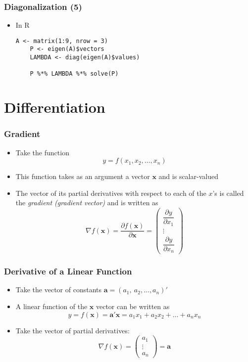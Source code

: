 \documentclass[10pt]{beamer}
\theoremstyle{definition}
\begin{document}
\begin{frame}[fragile]
\frametitle{Diagonalization (5)}
\begin{itemize}
	\item In R
	\begin{lstlisting}[style = rstyle, breaklines]
	A <- matrix(1:9, nrow = 3)
	P <- eigen(A)$vectors
	LAMBDA <- diag(eigen(A)$values)

	P %*% LAMBDA %*% solve(P)	
	\end{lstlisting}
\end{itemize}
\end{frame}

\section{Differentiation}
\begin{frame}[fragile]
	\frametitle{Gradient}
	\begin{itemize}
		\item Take the function
		\[
			y = f(x_{1}, x_{2}, \ldots, x_{n})
		\]
		
		\item This function takes as an argument a vector $ \mathbf{x} $ and is scalar-valued
		
		\item The vector of its partial derivatives with respect to each of the $ x $'s is called the \textit{gradient (gradient vector)} and is written as
		\[
			\nabla f(\mathbf{x}) = \dfrac{\partial f(\mathbf{x})}{\partial \mathbf{x}} = 
			\left(
			\begin{array}{c}
				\dfrac{\partial y}{\partial x_{1}}\\
				\vdots\\
				\dfrac{\partial y}{\partial x_{n}}
			\end{array}
			\right)
		\]
	\end{itemize}
\end{frame}

\begin{frame}[fragile]
	\frametitle{Derivative of a Linear Function}
	\begin{itemize}
		\item Take the vector of constants $ \mathbf{a} = (a_{1},\ a_{2}, \ldots, a_{n})' $
		
		\item A linear function of the $ \mathbf{x} $ vector can be written as
		\[
			y = f(\mathbf{x}) = \mathbf{a'x} = a_{1}x_{1} + a_{2}x_{2} + \ldots + a_{n}x_{n}
		\]
		
		\item Take the vector of partial derivatives:
		\[
			\nabla f(\mathbf{x}) = 
			\left(
			\begin{array}{c}
				a_{1}\\
				\vdots\\
				a_{n}
			\end{array} 
			\right) = 
			\mathbf{a}
		\]
	\end{itemize}
\end{frame}
\end{document}
